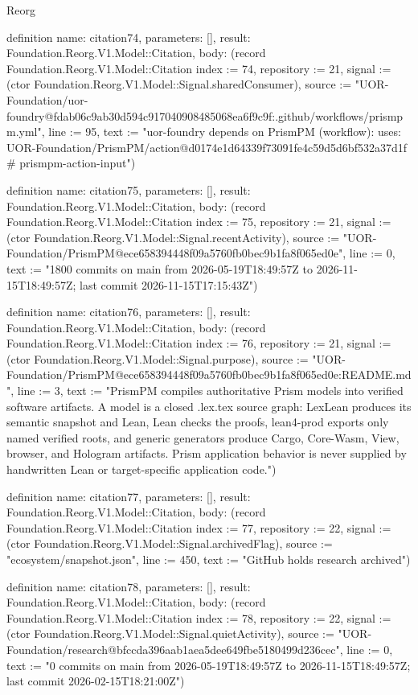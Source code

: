 \begin{lexlean}{Reorg}
\begin{semanticmodule}
definition{
  name: citation74,
  parameters: [],
  result: Foundation.Reorg.V1.Model::Citation,
  body: (record Foundation.Reorg.V1.Model::Citation {index := 74, repository := 21, signal := (ctor Foundation.Reorg.V1.Model::Signal.sharedConsumer), source := "UOR-Foundation/uor-foundry@fdab06c9ab30d594c917040908485068ea6f9c9f:.github/workflows/prismpm.yml", line := 95, text := "uor-foundry depends on PrismPM (workflow): uses: UOR-Foundation/PrismPM/action@d0174e1d64339f73091fe4c59d5d6bf532a37d1f # prismpm-action-input"})
}

definition{
  name: citation75,
  parameters: [],
  result: Foundation.Reorg.V1.Model::Citation,
  body: (record Foundation.Reorg.V1.Model::Citation {index := 75, repository := 21, signal := (ctor Foundation.Reorg.V1.Model::Signal.recentActivity), source := "UOR-Foundation/PrismPM@ece658394448f09a5760fb0bec9b1fa8f065ed0e", line := 0, text := "1800 commits on main from 2026-05-19T18:49:57Z to 2026-11-15T18:49:57Z; last commit 2026-11-15T17:15:43Z"})
}

definition{
  name: citation76,
  parameters: [],
  result: Foundation.Reorg.V1.Model::Citation,
  body: (record Foundation.Reorg.V1.Model::Citation {index := 76, repository := 21, signal := (ctor Foundation.Reorg.V1.Model::Signal.purpose), source := "UOR-Foundation/PrismPM@ece658394448f09a5760fb0bec9b1fa8f065ed0e:README.md", line := 3, text := "PrismPM compiles authoritative Prism models into verified software artifacts. A model is a closed .lex.tex source graph: LexLean produces its semantic snapshot and Lean, Lean checks the proofs, lean4-prod exports only named verified roots, and generic generators produce Cargo, Core-Wasm, View, browser, and Hologram artifacts. Prism application behavior is never supplied by handwritten Lean or target-specific application code."})
}

definition{
  name: citation77,
  parameters: [],
  result: Foundation.Reorg.V1.Model::Citation,
  body: (record Foundation.Reorg.V1.Model::Citation {index := 77, repository := 22, signal := (ctor Foundation.Reorg.V1.Model::Signal.archivedFlag), source := "ecosystem/snapshot.json", line := 450, text := "GitHub holds research archived"})
}

definition{
  name: citation78,
  parameters: [],
  result: Foundation.Reorg.V1.Model::Citation,
  body: (record Foundation.Reorg.V1.Model::Citation {index := 78, repository := 22, signal := (ctor Foundation.Reorg.V1.Model::Signal.quietActivity), source := "UOR-Foundation/research@bfccda396aab1aea5dee649fbe5180499d236cec", line := 0, text := "0 commits on main from 2026-05-19T18:49:57Z to 2026-11-15T18:49:57Z; last commit 2026-02-15T18:21:00Z"})
}


\end{semanticmodule}
\end{lexlean}
